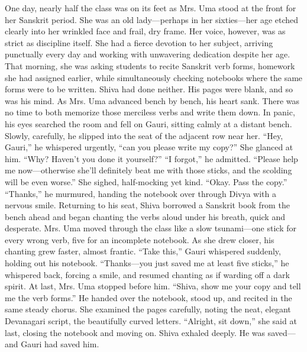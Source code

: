 One day, nearly half the class was on its feet as Mrs. Uma stood at the front for her Sanskrit period. She was an old lady—perhaps in her sixties—her age etched clearly into her wrinkled face and frail, dry frame. Her voice, however, was as strict as discipline itself. She had a fierce devotion to her subject, arriving punctually every day and working with unwavering dedication despite her age. That morning, she was asking students to recite Sanskrit verb forms, homework she had assigned earlier, while simultaneously checking notebooks where the same forms were to be written. Shiva had done neither. His pages were blank, and so was his mind. As Mrs. Uma advanced bench by bench, his heart sank. There was no time to both memorize those merciless verbs and write them down. In panic, his eyes searched the room and fell on Gauri, sitting calmly at a distant bench. Slowly, carefully, he slipped into the seat of the adjacent row near her. ``Hey, Gauri,'' he whispered urgently, ``can you please write my copy?'' She glanced at him. ``Why? Haven't you done it yourself?'' ``I forgot,'' he admitted. ``Please help me now—otherwise she'll definitely beat me with those sticks, and the scolding will be even worse.'' She sighed, half-mocking yet kind. ``Okay. Pass the copy.'' ``Thanks,'' he murmured, handing the notebook over through Divya with a nervous smile. Returning to his seat, Shiva borrowed a Sanskrit book from the bench ahead and began chanting the verbs aloud under his breath, quick and desperate. Mrs. Uma moved through the class like a slow tsunami—one stick for every wrong verb, five for an incomplete notebook. As she drew closer, his chanting grew faster, almost frantic. ``Take this,'' Gauri whispered suddenly, holding out his notebook. ``Thanks—you just saved me at least five sticks,'' he whispered back, forcing a smile, and resumed chanting as if warding off a dark spirit. At last, Mrs. Uma stopped before him. ``Shiva, show me your copy and tell me the verb forms.'' He handed over the notebook, stood up, and recited in the same steady chorus. She examined the pages carefully, noting the neat, elegant Devanagari script, the beautifully curved letters. ``Alright, sit down,'' she said at last, closing the notebook and moving on. Shiva exhaled deeply. He was saved—and Gauri had saved him.

